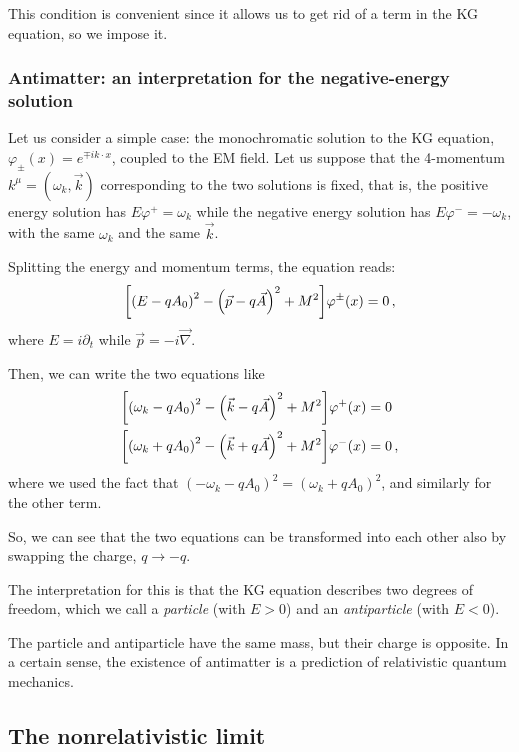 \documentclass[main.tex]{subfiles}
\begin{document}
This condition is convenient since it allows us to get rid of a term in the KG equation, so we impose it. 

\subsubsection{Antimatter: an interpretation for the negative-energy solution}

Let us consider a simple case: the monochromatic solution to the KG equation, \(\varphi_{\pm} (x) = e^{\mp i k \cdot x}\), coupled to the EM field.
Let us suppose that the 4-momentum \(k^{\mu} = (\omega_{k}, \vec{k})\) corresponding to the two solutions is fixed, that is, the positive energy solution has \(E \varphi^{+} = \omega_{k}\) while the negative energy solution has \(E \varphi^{-} = - \omega_{k}\), with the same \(\omega_{k}\) and the same \(\vec{k}\). 

Splitting the energy and momentum terms, the equation reads: 
%
\begin{align}
\qty[\qty(E - q A_0 )^2 - \qty(\vec{p} - q \vec{A})^2 + M^2] \varphi^{\pm}(x) = 0
\,,
\end{align}
%
where \(E = i \partial_{t} \) while \(\vec{p} = - i \vec{\nabla}\). 

Then, we can write the two equations like 
%
\begin{subequations}
\begin{align}
\qty[\qty(\omega_{k} - q A_0 )^2 - \qty(\vec{k} - q \vec{A})^2 + M^2] \varphi^{+}(x) &= 0 \\
\qty[\qty(\omega_{k} + q A_0 )^2 - \qty(\vec{k} + q \vec{A})^2 + M^2] \varphi^{-}(x) &= 0 
\,,
\end{align}
\end{subequations}
%
where we used the fact that \((-\omega_{k} - q A_0 )^2 = (\omega_{k} + q A_0 )^2\), and similarly for the other term.  

So, we can see that the two equations can be transformed into each other also by swapping the charge, \(q \rightarrow -q\). 

The interpretation for this is that the KG equation describes two degrees of freedom, which we call a \emph{particle} (with \(E>0\)) and an \emph{antiparticle} (with \(E<0\)).

The particle and antiparticle have the same mass, but their charge is opposite. 
In a certain sense, the existence of antimatter is a prediction of relativistic quantum mechanics. 

\subsection{The nonrelativistic limit}
\end{document}
